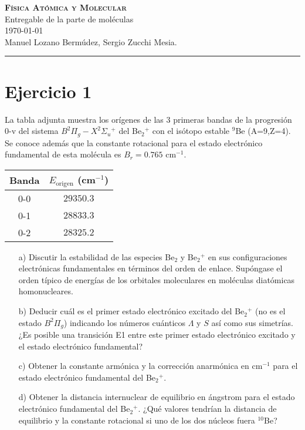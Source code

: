 \documentclass{article}
\begin{document}
\begin{center}
   \HUGE\textbf{ \scshape Física Atómica y Molecular}  \\ \huge Entregable de la parte de moléculas \\ \vspace{0.5cm}\today \\
   \vspace{0.7cm}
   \large Manuel Lozano Bermúdez, Sergio Zucchi Mesia.\\ \rule{\textwidth}{2pt} 
\end{center}

\section*{Ejercicio 1}
\begin{minipage}{0.72\textwidth}
La tabla adjunta muestra los orígenes de las 3 primeras bandas de la progresión 0-v del sistema $B^2\Pi_g - X^2\Sigma_u{}^+$ del Be$_2{}^+$ con el isótopo estable $^9$Be (A=9,Z=4). Se conoce además que la constante rotacional para el estado electrónico fundamental de esta molécula es $B_r = 0.765$ cm$^{-1}$.
\end{minipage}
\begin{minipage}{.3\textwidth}
\centering
        \begin{tabular}{|c|c|} \hline 
            Banda & $E_\text{origen} $ (cm$^{-1}$) \\ \hline 
             0-0&$29350.3$  \\ \hline 
             0-1&$28833.3$  \\ \hline 
             0-2&$28325.2$  \\  \hline 
        \end{tabular}
        \label{tab:ej1}
\end{minipage}


\begin{enumerate}
    \item[a)] Discutir la estabilidad de las especies Be$_2$ y Be$_2{}^+$ en sus configuraciones electrónicas fundamentales en términos del orden de enlace. Supóngase el orden típico de energías de los orbitales moleculares en moléculas diatómicas homonucleares. 

    \item[b)] Deducir cuál es el primer estado electrónico excitado del Be$_2{}^+$ (no es el estado $B^2 \Pi_g$) indicando los números cuánticos $\Lambda$ y $S$ así como sus simetrías. ¿Es posible una transición E1 entre este primer estado electrónico excitado y el estado electrónico fundamental?

    \item[c)] Obtener la constante armónica y la corrección anarmónica en cm$^{-1}$ para el estado electrónico fundamental del Be$_2{}^+$.

    \item[d)] Obtener la distancia internuclear de equilibrio en ángstrom para el estado electrónico fundamental del Be$_2{}^+$. ¿Qué valores tendrían la distancia de equilibrio y la constante rotacional si uno de los dos núcleos fuera $^{10}$Be? 
\end{enumerate}
\end{document}
